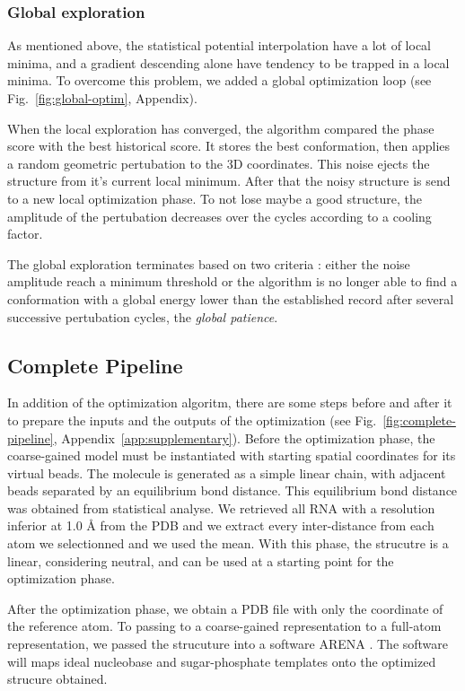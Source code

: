 \documentclass[11pt,a4paper]{article}
\begin{document}
\subsubsection{Global exploration}

As mentioned above, the statistical potential interpolation have a lot of local minima, and a gradient descending alone have tendency to be trapped in a local minima. To overcome this problem, we added a global optimization loop (see Fig.~\ref{fig:global-optim}, Appendix).

When the local exploration has converged, the algorithm compared the phase score with the best historical score. It stores the best conformation, then applies a random geometric pertubation to the 3D coordinates. This noise ejects the structure from it's current local minimum. After that the noisy structure is send to a new local optimization phase. To not lose maybe a good structure, the amplitude of the pertubation decreases over the cycles according to a cooling factor.

The global exploration terminates based on two criteria : either the noise amplitude reach a minimum threshold or the algorithm is no longer able to find a conformation with a global energy lower than the established record after several successive pertubation cycles, the \textit{global patience}.

\subsection{Complete Pipeline}

In addition of the optimization algoritm, there are some steps before and after it to prepare the inputs and the outputs of the optimization (see Fig.~\ref{fig:complete-pipeline}, Appendix~\ref{app:supplementary}). Before the optimization phase, the coarse-gained model must be instantiated with starting spatial coordinates for its virtual beads. The molecule is generated as a simple linear chain, with adjacent beads separated by an equilibrium bond distance. This equilibrium bond distance was obtained from statistical analyse. We retrieved all RNA with a resolution inferior at 1.0 \r{A}  from the PDB and we extract every inter-distance from each atom we selectionned and we used the mean. With this phase, the strucutre is a linear, considering neutral, and can be used at a starting point for the optimization phase. 

After the optimization phase, we obtain a PDB file with only the coordinate of the reference atom. To passing to a coarse-gained representation to a full-atom representation, we passed the strucuture into a software ARENA \cite{perry_arena_2023}. The software will maps ideal nucleobase and sugar-phosphate templates onto the optimized strucure obtained. 
\end{document}
